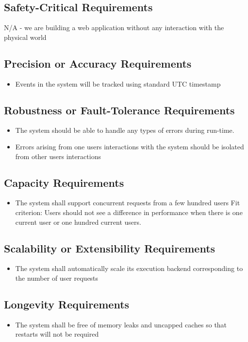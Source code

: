 \documentclass[12pt]{article}
\begin{document}
\subsection{Safety-Critical Requirements}
N/A - we are building a web application without any interaction with the physical world
\subsection{Precision or Accuracy Requirements}
\begin{itemize}
    \item Events in the system will be tracked using standard UTC timestamp
\end{itemize}
\subsection{Robustness or Fault-Tolerance Requirements}
\begin{itemize}
    \item The system should be able to handle any types of errors during run-time.
    \item Errors arising from one users interactions with the system should be isolated from other users interactions
\end{itemize}

\subsection{Capacity Requirements}
\begin{itemize}
    \item The system shall support concurrent requests from a few hundred users \hfill \break
    Fit criterion: Users should not see a difference in performance when there is one current user or one hundred current users.
\end{itemize}

\subsection{Scalability or Extensibility Requirements}
\begin{itemize}
    \item The system shall automatically scale its execution backend corresponding to the number of user requests
\end{itemize}

\subsection{Longevity Requirements}
\begin{itemize}
    \item The system shall be free of memory leaks and uncapped caches so that restarts will not be required
\end{itemize}
\end{document}
